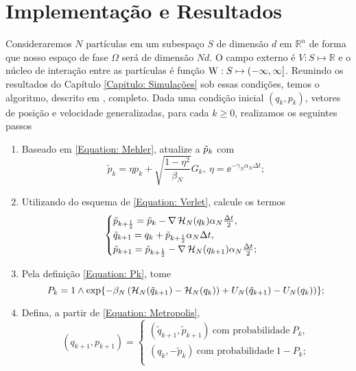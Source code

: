 \chapter{Implementação e Resultados}
\label{Capitulo: Resultados}

Consideraremos $N$ partículas em um subespaço $S$ de dimensão $d$ em $\mathbb{R}^n$ de forma que nosso espaço de fase $\Omega$ será de dimensão $Nd$. O campo externo é $V : S \mapsto \mathbb{R}$ e o núcleo de interação entre as partículas é função $\operatorname{W} : S \mapsto (-\infty, \infty]$. Reunindo os resultados do Capítulo \ref{Capitulo: Simulações} sob essas condições, temos o algoritmo, descrito em \cite{Chafa2018}, completo. Dada uma condição inicial $(q_k, p_k)$,  vetores de posição e velocidade generalizadas, para cada $k\geq0$, realizamos os seguintes passos
\begin{enumerate}
	\item Baseado em \ref{Equation: Mehler}, atualize a $\tilde{p}_k$ com
	\begin{equation}
	\tilde{p}_k = \eta p_k + \sqrt{\frac{1-\eta^2}{\beta_N}} G_k, \ \eta = \ee^{-\gamma_N \alpha_N \Delta t};
	\label{Equation: Alg Mehler}
	\end{equation}
	\item Utilizando do esquema de \ref{Equation: Verlet}, calcule os termos
	\begin{equation}
	\begin{cases}
		\tilde{p}_{k+\frac{1}{2}} = \tilde{p}_k - \nabla \operatorname{\mathcal{H}}_N(q_k) \alpha_N \frac{\Delta t}{2}, \\
		\tilde{q}_{k+1} = q_k + \tilde{p}_{k + \frac{1}{2}} \alpha_N \Delta t, \\
		\tilde{p}_{k+1} = \tilde{p}_{k+\frac{1}{2}} - \nabla \operatorname{\mathcal{H}}_N(q_{k+1}) \alpha_N \frac{\Delta t}{2};
		\label{Equation: Alg Verlet}
	\end{cases}
	\end{equation}
	\item Pela definição \ref{Equation: Pk}, tome
	\begin{equation}
	P_k = 1 \wedge \exp{ -\beta_N \left(  \operatorname{\mathcal{H}}_N(\tilde{q}_{k+1}) -  \operatorname{\mathcal{H}}_N(q_k) \right) + U_N(\tilde{q}_{k+1}) - U_N(q_k))};
	\label{Equação: Alg Pk}
	\end{equation}
	\item Defina, a partir de \ref{Equation: Metropolis}, 
	\begin{equation}
	(q_{k+1}, p_{k+1}) = 
	\begin{cases}
		(\tilde{q}_{k+1}, \tilde{p}_{k+1}) \ \text{com probabilidade} \ P_k, \\
		(q_k, -\tilde{p}_{k}) \ \text{com probabilidade} \ 1-P_k; \\
	\end{cases}
	\label{Equation: Alg Metro}
	\end{equation}
\end{enumerate}

